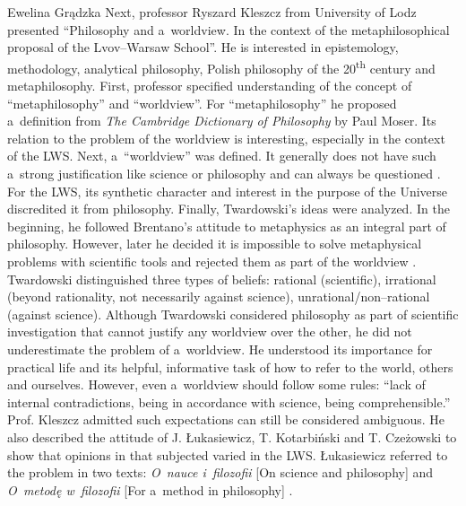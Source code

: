 \begin{editorialeng}{Ewelina Grądzka}
Next, professor Ryszard Kleszcz from University of Lodz presented “Philosophy and a~worldview. In the context of the metaphilosophical proposal of the Lvov--Warsaw School”. He is interested in epistemology, methodology, analytical philosophy, Polish philosophy of the 20\textsuperscript{th} century and metaphilosophy. First, professor specified understanding of the concept of “metaphilosophy” and “worldview”. For “metaphilosophy” he proposed a~definition from \textit{The Cambridge Dictionary of Philosophy} by Paul Moser. Its relation to the problem of the worldview is interesting, especially in the context of the LWS. Next, a~“worldview” was defined. It generally does not have such a~strong justification like science or philosophy and can always be questioned
\parencite[][cf.]{bochenski_logika_2016}. %
 For the LWS, its synthetic character and interest in the purpose of the Universe discredited it from philosophy. Finally, Twardowski’s ideas were analyzed. In the beginning, he followed Brentano’s attitude to metaphysics as an integral part of philosophy. However, later he decided it is impossible to solve metaphysical problems with scientific tools and rejected them as part of the worldview 
\parencite[][cf.]{twardowski_przemowienie_1965}. %
 Twardowski distinguished three types of beliefs: rational (scientific), irrational (beyond rationality, not necessarily against science), unrational/non--rational (against science). Although Twardowski considered philosophy as part of scientific investigation that cannot justify any worldview over the other, he did not underestimate the problem of a~worldview. He understood its importance for practical life and its helpful, informative task of how to refer to the world, others and ourselves. However, even a~worldview should follow some rules: “lack of internal contradictions, being in accordance with science, being comprehensible.” Prof. Kleszcz admitted such expectations can still be considered ambiguous. He also described the attitude of J. Łukasiewicz, T. Kotarbiński and T. Czeżowski to show that opinions in that subjected varied in the LWS. Łukasiewicz referred to the problem in two texts: \textit{O~nauce i~filozofii} [On science and philosophy] 
\parencite*[][]{lukasiewicz_o_1915} %
 and \textit{O~metodę w~filozofii} [For a~method in philosophy] 
\parencite*[][]{lukasiewicz_o_1927}. %

\end{editorialeng}
